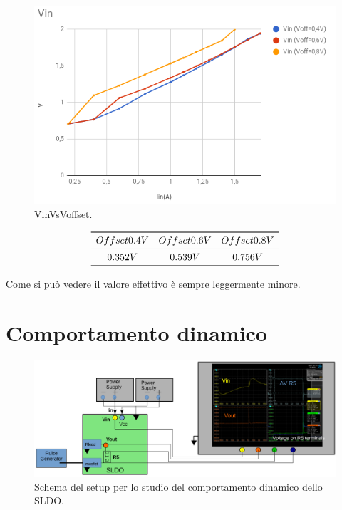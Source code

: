 \begin{figure}
\centering
\includegraphics[scale=.4]{Immagini/VinVsVoffset}
\caption{VinVsVoffset.}
\label{VinVsVoffset}
\end{figure}
\[
\begin{array}{ccc}

\toprule
Offset 0.4 V & Offset 0.6 V & Offset 0.8 V  \\

\midrule

0.352 V & 0.539 V & 0.756 V \\

\bottomrule
\end{array}
\]

Come si può vedere il valore effettivo è sempre leggermente minore. 

\section{Comportamento dinamico}

\begin{figure}
\centering
\includegraphics[scale=.3]{Immagini/SetupScheme}
\caption{Schema del setup per lo studio del comportamento dinamico dello SLDO.}
\label{Setupscheme}
\end{figure}

